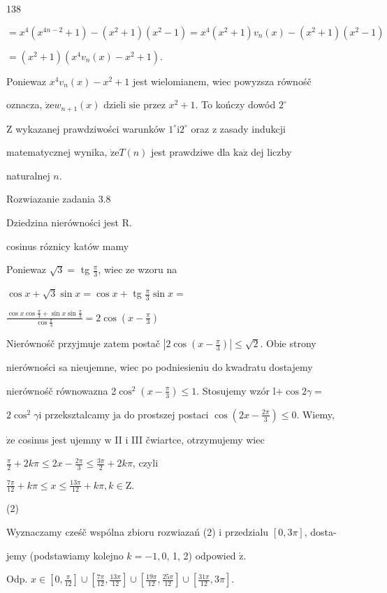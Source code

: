 \documentclass[a4paper,12pt]{article}
\begin{document}
138

$=x^{4}(x^{4n-2}+1)-(x^{2}+1)(x^{2}-1)=x^{4}(x^{2}+1)v_{n}(x)-(x^{2}+1)(x^{2}-1)$

$=(x^{2}+1)(x^{4}v_{n}(x)-x^{2}+1).$

Poniewaz $x^{4}v_{n}(x)-x^{2}+1$ jest wielomianem, wiec powyzsza równośč

oznacza, $\dot{\mathrm{z}}\mathrm{e}w_{n+1}(x)$ dzieli $\mathrm{s}\mathrm{i}\mathrm{e}$ przez $x^{2}+1$. To kończy dowód $2^{\circ}$

$\mathrm{Z}$ wykazanej prawdziwości warunków $1^{\circ} \mathrm{i} 2^{\circ}$ oraz $\mathrm{z}$ zasady indukcji

matematycznej wynika, $\dot{\mathrm{z}}\mathrm{e} T(n)$ jest prawdziwe dla $\mathrm{k}\mathrm{a}\dot{\mathrm{z}}$ dej liczby

naturalnej $n.$

Rozwiazanie zadania 3.8

Dziedzina nierówności jest R.

cosinus róznicy katów mamy

Poniewaz $\sqrt{3}=$ tg $\displaystyle \frac{\pi}{3}$, wiec ze wzoru na

$\cos x+\sqrt{3}\sin x=\cos x +$ tg $\displaystyle \frac{\pi}{3}\sin x=$

$\displaystyle \frac{\cos x\cos\frac{\pi}{3}+\sin x\sin\frac{\pi}{3}}{\cos\frac{\pi}{3}}=2\cos(x-\frac{\pi}{3})$

Nierównośč przyjmuje zatem postač $|2\displaystyle \cos(x-\frac{\pi}{3})| \leq \sqrt{2}$. Obie strony

nierówności sa nieujemne, wiec po podniesieniu do kwadratu dostajemy

nierównośč równowazna 2$\displaystyle \cos^{2}(x-\frac{\pi}{3}) \leq 1$. Stosujemy wzór l$+ \cos 2\gamma=$

$2\cos^{2}\gamma \mathrm{i}$ przeksztalcamy $\mathrm{j}\mathrm{a}$ do prostszej postaci $\displaystyle \cos(2x-\frac{2\pi}{3}) \leq 0$. Wiemy,

$\dot{\mathrm{z}}\mathrm{e}$ cosinus jest ujemny $\mathrm{w}$ II $\mathrm{i}$ III čwiartce, otrzymujemy wiec

$\displaystyle \frac{\pi}{2}+2k\pi\leq 2x-\frac{2\pi}{3}\leq\frac{3\pi}{2}+2k\pi$, czyli

$\displaystyle \frac{7\pi}{12}+k\pi\leq x\leq\frac{13\pi}{12}+k\pi, k\in \mathrm{Z}.$

(2)

Wyznaczamy cześč wspólna zbioru rozwiazań (2) $\mathrm{i}$ przedzialu $[0,3\pi]$, dosta-

jemy (podstawiamy kolejno $k=-1, 0$, 1, 2) odpowied $\acute{\mathrm{z}}.$

Odp. $ x\in [0,\displaystyle \frac{\pi}{12}]\cup [\displaystyle \frac{7\pi}{12},\frac{13\pi}{12}]\cup [\displaystyle \frac{19\pi}{12},\frac{25\pi}{12}]\cup [\displaystyle \frac{31\pi}{12},3\pi].$
\end{document}
